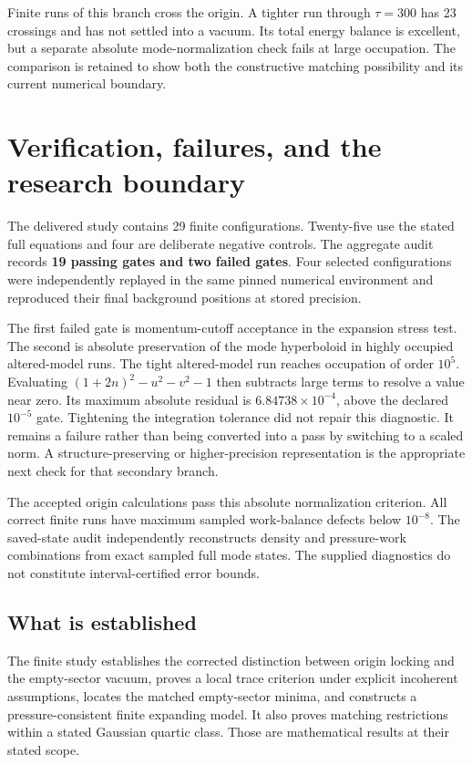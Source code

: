 \documentclass[11pt]{article}
\theoremstyle{definition}\newtheorem{definition}[theorem]{Definition}
\begin{document}
Finite runs of this branch cross the origin. A tighter run through $\tau=300$ has 23 crossings and has not settled into a vacuum. Its total energy balance is excellent, but a separate absolute mode-normalization check fails at large occupation. The comparison is retained to show both the constructive matching possibility and its current numerical boundary.

\section{Verification, failures, and the research boundary}
The delivered study contains 29 finite configurations. Twenty-five use the stated full equations and four are deliberate negative controls. The aggregate audit records \textbf{19 passing gates and two failed gates}. Four selected configurations were independently replayed in the same pinned numerical environment and reproduced their final background positions at stored precision.

The first failed gate is momentum-cutoff acceptance in the expansion stress test. The second is absolute preservation of the mode hyperboloid in highly occupied altered-model runs. The tight altered-model run reaches occupation of order $10^5$. Evaluating
$(1+2n)^2-u^2-v^2-1$ then subtracts large terms to resolve a value near zero. Its maximum absolute residual is $6.84738\times10^{-4}$, above the declared $10^{-5}$ gate. Tightening the integration tolerance did not repair this diagnostic. It remains a failure rather than being converted into a pass by switching to a scaled norm. A structure-preserving or higher-precision representation is the appropriate next check for that secondary branch.

The accepted origin calculations pass this absolute normalization criterion. All correct finite runs have maximum sampled work-balance defects below $10^{-8}$. The saved-state audit independently reconstructs density and pressure-work combinations from exact sampled full mode states. The supplied diagnostics do not constitute interval-certified error bounds.

\subsection{What is established}
The finite study establishes the corrected distinction between origin locking and the empty-sector vacuum, proves a local trace criterion under explicit incoherent assumptions, locates the matched empty-sector minima, and constructs a pressure-consistent finite expanding model. It also proves matching restrictions within a stated Gaussian quartic class. Those are mathematical results at their stated scope.
\end{document}
